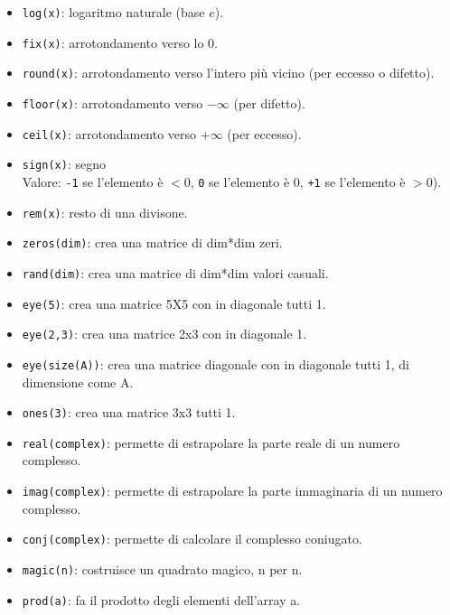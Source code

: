 \begin{itemize}
	\item	\texttt{log(x)}: logaritmo naturale (base $e$).
	
	\item	\texttt{fix(x)}: arrotondamento verso lo 0.
	
	\item	\texttt{round(x)}: arrotondamento verso l'intero più vicino (per eccesso o difetto).
	
	\item	\texttt{floor(x)}: arrotondamento verso $-\infty$ (per difetto).
	
	\item	\texttt{ceil(x)}: arrotondamento verso $+\infty$ (per eccesso).
	
	\item	\texttt{sign(x)}: segno \\ 
	Valore: \texttt{-1} se l'elemento è $< 0$,  \texttt{0} se l'elemento è $0$,  \texttt{+1} se l'elemento è $> 
	0$).
	
	\item	\texttt{rem(x)}: resto di una divisone.

    \item	\texttt{zeros(dim)}: crea una matrice di dim*dim zeri.
    \item	\texttt{rand(dim)}: crea una matrice di dim*dim valori casuali. 
    \item	\texttt{eye(5)}: crea una matrice 5X5 con in diagonale tutti 1.
    \item	\texttt{eye(2,3)}: crea una matrice 2x3 con in diagonale 1.
    \item	\texttt{eye(size(A))}: crea una matrice diagonale con in diagonale tutti 1, di dimensione come A.
    \item	\texttt{ones(3)}: crea una matrice 3x3 tutti 1.

    \item	\texttt{real(complex)}: permette di estrapolare la parte reale di un numero complesso.
    \item	\texttt{imag(complex)}: permette di estrapolare la parte immaginaria di un numero complesso.
    \item	\texttt{conj(complex)}: permette di calcolare il complesso coniugato.
    \item	\texttt{magic(n)}: costruisce un quadrato magico, n per n.
    \item	\texttt{prod(a)}: fa il prodotto degli elementi dell'array a.

\end{itemize}